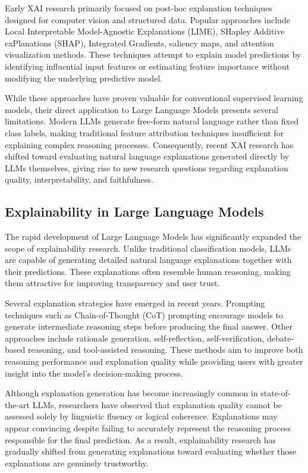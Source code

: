 \documentclass{article}
\begin{document}
Early XAI research primarily focused on post-hoc explanation techniques designed for computer vision and structured data. Popular approaches include Local Interpretable Model-Agnostic Explanations (LIME), SHapley Additive exPlanations (SHAP), Integrated Gradients, saliency maps, and attention visualization methods. These techniques attempt to explain model predictions by identifying influential input features or estimating feature importance without modifying the underlying predictive model.

While these approaches have proven valuable for conventional supervised learning models, their direct application to Large Language Models presents several limitations. Modern LLMs generate free-form natural language rather than fixed class labels, making traditional feature attribution techniques insufficient for explaining complex reasoning processes. Consequently, recent XAI research has shifted toward evaluating natural language explanations generated directly by LLMs themselves, giving rise to new research questions regarding explanation quality, interpretability, and faithfulness.

\subsection{Explainability in Large Language Models}

The rapid development of Large Language Models has significantly expanded the scope of explainability research. Unlike traditional classification models, LLMs are capable of generating detailed natural language explanations together with their predictions. These explanations often resemble human reasoning, making them attractive for improving transparency and user trust.

Several explanation strategies have emerged in recent years. Prompting techniques such as Chain-of-Thought (CoT) prompting encourage models to generate intermediate reasoning steps before producing the final answer. Other approaches include rationale generation, self-reflection, self-verification, debate-based reasoning, and tool-assisted reasoning. These methods aim to improve both reasoning performance and explanation quality while providing users with greater insight into the model's decision-making process.

Although explanation generation has become increasingly common in state-of-the-art LLMs, researchers have observed that explanation quality cannot be assessed solely by linguistic fluency or logical coherence. Explanations may appear convincing despite failing to accurately represent the reasoning process responsible for the final prediction. As a result, explainability research has gradually shifted from generating explanations toward evaluating whether those explanations are genuinely trustworthy.
\end{document}
